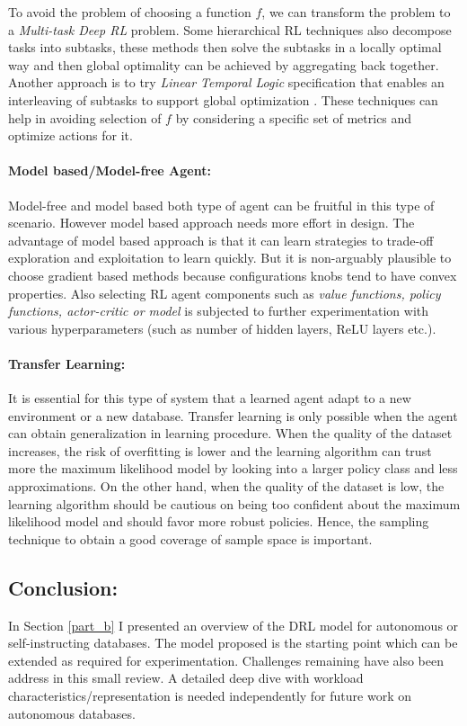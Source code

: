 To avoid the problem of choosing a function $f$, we can transform the problem to a {\em Multi-task Deep RL} problem.
Some hierarchical RL techniques also decompose tasks into subtasks, these methods then solve the subtasks
in a locally optimal way and then global optimality can be achieved by aggregating back together. Another approach is to try {\em Linear Temporal Logic} specification that enables an interleaving of subtasks to support global optimization \cite{icarte2018teaching}.
These techniques can help in avoiding selection of $f$ by considering a specific set of metrics and optimize actions for it.


\paragraph{Model based/Model-free Agent:}
Model-free and model based both type of agent can be fruitful in this type of scenario. However model based approach needs more effort in design.
The advantage of model based approach is that it can learn strategies to trade-off exploration and exploitation to learn quickly.
But it is non-arguably plausible to choose gradient based methods because configurations knobs tend to have convex properties.
Also selecting RL agent components such as {\em value functions, policy functions, actor-critic or model} is subjected to further experimentation with various hyperparameters (such as number of hidden layers, ReLU layers etc.).

\paragraph{Transfer Learning:}
It is essential for this type of system that a learned agent adapt to a new environment or a new database.
Transfer learning is only possible when the agent can obtain generalization in learning procedure.
When the quality
of the dataset increases, the risk of overfitting is lower and the learning
algorithm can trust more the maximum likelihood model by looking
into a larger policy class and less approximations.
On the other hand, when the quality of the dataset is low, the learning algorithm should be
cautious on being too confident about the maximum likelihood model
and should favor more robust policies. Hence, the sampling technique to obtain a good coverage of sample space is important.


\subsection{Conclusion:}
In Section \ref{part_b} I presented an overview of the DRL model for autonomous or self-instructing databases. The model proposed is the starting point which can be extended as required for experimentation.  Challenges remaining have also been address in this small review.
A detailed deep dive with workload characteristics/representation is needed independently for future work on autonomous databases.








